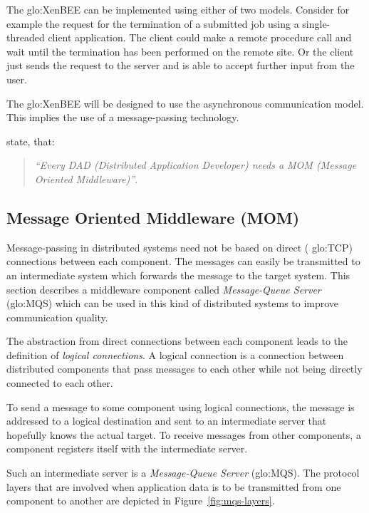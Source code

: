 The  \gls{glo:XenBEE}  can be  implemented  using  either  of two  models.
Consider for  example the request for  the termination of  a submitted job
using a single-threaded client application. The client could make a remote
procedure call  and wait until the  termination has been  performed on the
remote site.   Or the client just sends  the request to the  server and is
able to accept further input from the user.

The   \gls{glo:XenBEE}  will   be   designed  to   use  the   asynchronous
communication  model.    This  implies   the  use  of   a  message-passing
technology.

\citet{dad-mom}  state, that:
\begin{quotation}
  \emph{``Every  DAD  (Distributed  Application  Developer)  needs  a  MOM
    (Message Oriented Middleware)''}.
\end{quotation}


\subsection[Message Oriented Middleware]{Message Oriented Middleware (MOM)}
\label{sec:fundamentals:mom}

Message-passing in  distributed systems need  not be based on  direct (\eg
\gls{glo:TCP}) connections between each component. The messages can easily
be transmitted to an intermediate system which forwards the message to the
target  system.   This section  describes  a  middleware component  called
\emph{Message-Queue Server} (\gls{glo:MQS}) which can be used in this kind
of distributed systems to improve communication quality.

The abstraction  from direct connections  between each component  leads to
the definition  of \emph{logical connections}.  A logical  connection is a
connection between distributed components that pass messages to each other
while not being directly connected to each other.

To send a message to some component using logical connections, the message
is addressed to  a logical destination and sent  to an intermediate server
that hopefully  knows the  actual target. To  receive messages  from other
components, a component registers itself with the intermediate server.

Such   an   intermediate   server   is   a   \emph{Message-Queue   Server}
(\gls{glo:MQS}). The  protocol layers  that are involved  when application
data is  to be transmitted from  one component to another  are depicted in
Figure~\ref{fig:mqs-layers}.

